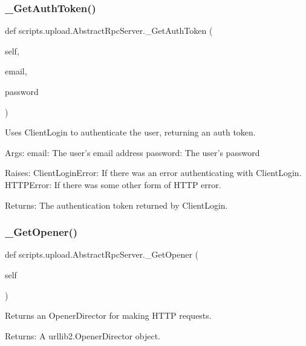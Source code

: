 \subsubsection{\texorpdfstring{\_GetAuthToken()}{\_GetAuthToken()}}
{\footnotesize\ttfamily def scripts.\+upload.\+Abstract\+Rpc\+Server.\+\_\+\+Get\+Auth\+Token (\begin{DoxyParamCaption}\item[{}]{self,  }\item[{}]{email,  }\item[{}]{password }\end{DoxyParamCaption})\hspace{0.3cm}{\ttfamily [private]}}

\begin{DoxyVerb}Uses ClientLogin to authenticate the user, returning an auth token.

Args:
  email:    The user's email address
  password: The user's password

Raises:
  ClientLoginError: If there was an error authenticating with ClientLogin.
  HTTPError: If there was some other form of HTTP error.

Returns:
  The authentication token returned by ClientLogin.
\end{DoxyVerb}
 \mbox{\label{classscripts_1_1upload_1_1_abstract_rpc_server_ab0cceb66841d2edd2090a448318eed17}} 
\subsubsection{\texorpdfstring{\_GetOpener()}{\_GetOpener()}}
{\footnotesize\ttfamily def scripts.\+upload.\+Abstract\+Rpc\+Server.\+\_\+\+Get\+Opener (\begin{DoxyParamCaption}\item[{}]{self }\end{DoxyParamCaption})\hspace{0.3cm}{\ttfamily [private]}}

\begin{DoxyVerb}Returns an OpenerDirector for making HTTP requests.

Returns:
  A urllib2.OpenerDirector object.
\end{DoxyVerb}
 


